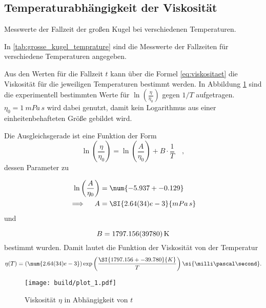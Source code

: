 \subsection{Temperaturabhängigkeit der Viskosität}

\begin{table}
  \centering
  
  \caption{Messwerte der Fallzeit der großen Kugel bei verschiedenen Temperaturen.}
  \label{tab:grosse_kugel_temprature}
\end{table}

\noindent In \autoref{tab:grosse_kugel_temprature} sind die Messwerte der Fallzeiten für verschiedene Temperaturen angegeben.


\noindent Aus den Werten für die Fallzeit $t$ kann über die Formel \eqref{eq:viskositaet} die Viskosität für die jeweiligen Temperaturen bestimmt werden.
In Abbildung \ref{fig:grosse_kugel_temperatur} sind die experimentell bestimmten Werte für $\ln{\left( \frac{\eta}{\eta_0}\right)} $ gegen $1/T$ aufgetragen.
$\eta_0 = \SI{1}{mPa \, s}$ wird dabei genutzt, damit kein Logarithmus aus einer einheitenbehafteten Größe gebildet wird.

\noindent Die Ausgleichsgerade ist eine Funktion der Form
\begin{equation*}
  \ln{\left( \frac{\eta}{\eta_0}\right)} = \ln{\left( \frac{A}{\eta_0}\right)} + B \cdot \frac{1}{T} \quad, 
\end{equation*}
dessen Parameter zu 

\begin{align*}
  \ln{\left( \frac{A}{\eta_0}\right)} &= \num{-5.937 +- 0.129 } \\
  \implies \quad A &= \SI{2.64(34)e-3}{mPa \, s}
\end{align*}
und

\begin{equation*}
  B = \SI{1797.156 +- 39.780}{K}
\end{equation*}
bestimmt wurden.
Damit lautet die Funktion der Viskosität von der Temperatur
\begin{equation*}
  \eta(T) = (\num{2.64(34)e-3}) \exp\left(\frac{\SI{1797.156 +- 39.780}{K}}{T}\right) \si{\milli\pascal\second}.
\end{equation*}

\begin{figure}[H]
  \centering
  \texttt{[image: build/plot\_1.pdf]}
  \caption{Viskosität $\eta$ in Abhängigkeit von $t$}
  \label{fig:grosse_kugel_temperatur}
\end{figure}




